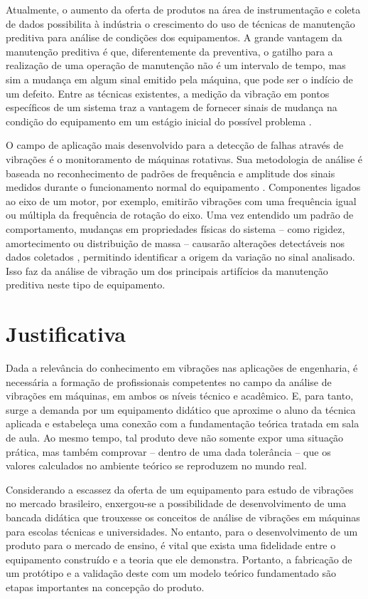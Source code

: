 \documentclass[12pt,openright,oneside,a4paper,
	chapter=TITLE,section=TITLE,
	english,brazil]{abntex2}
\begin{document}
	Atualmente, o aumento da oferta de produtos na área de instrumentação e coleta de dados possibilita à indústria o crescimento do uso de técnicas de manutenção preditiva para análise de condições dos equipamentos. A grande vantagem da manutenção preditiva é que, diferentemente da preventiva, o gatilho para a realização de uma operação de manutenção não é um intervalo de tempo, mas sim a mudança em algum sinal emitido pela máquina, que pode ser o indício de um defeito. Entre as técnicas existentes, a medição da vibração em pontos específicos de um sistema traz a vantagem de fornecer sinais de mudança na condição do equipamento em um estágio inicial do possível problema \cite{al-najjar:2003}.
	
	O campo de aplicação mais desenvolvido para a detecção de falhas através de vibrações é o monitoramento de máquinas rotativas. Sua metodologia de análise é baseada no reconhecimento de padrões de frequência e amplitude dos sinais medidos durante o funcionamento normal do equipamento \cite{carden:2004}. Componentes ligados ao eixo de um motor, por exemplo, emitirão vibrações com uma frequência igual ou múltipla da frequência de rotação do eixo. Uma vez entendido um padrão de comportamento, mudanças em propriedades físicas do sistema -- como rigidez, amortecimento ou distribuição de massa -- causarão alterações detectáveis nos dados coletados \cite{qiao:2011}, permitindo identificar a origem da variação no sinal analisado. Isso faz da análise de vibração um dos principais artifícios da manutenção preditiva neste tipo de equipamento.
	
	\section{Justificativa}
	Dada a relevância do conhecimento em vibrações nas aplicações de engenharia, é necessária a formação de profissionais competentes no campo da análise de vibrações em máquinas, em ambos os níveis técnico e acadêmico. E, para tanto, surge a demanda por um equipamento didático que aproxime o aluno da técnica aplicada e estabeleça uma conexão com a fundamentação teórica tratada em sala de aula. Ao mesmo tempo, tal produto deve não somente expor uma situação prática, mas também comprovar -- dentro de uma dada tolerância -- que os valores calculados no ambiente teórico se reproduzem no mundo real.
	
	Considerando a escassez da oferta de um equipamento para estudo de vibrações no mercado brasileiro, enxergou-se a possibilidade de desenvolvimento de uma bancada didática que trouxesse os conceitos de análise de vibrações em máquinas para escolas técnicas e universidades. No entanto, para o desenvolvimento de um produto para o mercado de ensino, é vital que exista uma fidelidade entre o equipamento construído e a teoria que ele demonstra. Portanto, a fabricação de um protótipo e a validação deste com um modelo teórico fundamentado são etapas importantes na concepção do produto.
	
\end{document}
